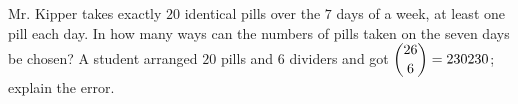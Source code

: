 Mr. Kipper takes exactly $20$ identical pills over the $7$ days of a week, at least one pill each day. In how many ways can the numbers of pills taken on the seven days be chosen? A student arranged $20$ pills and $6$ dividers and got $\dbinom{26}{6}=230230$; explain the error.
